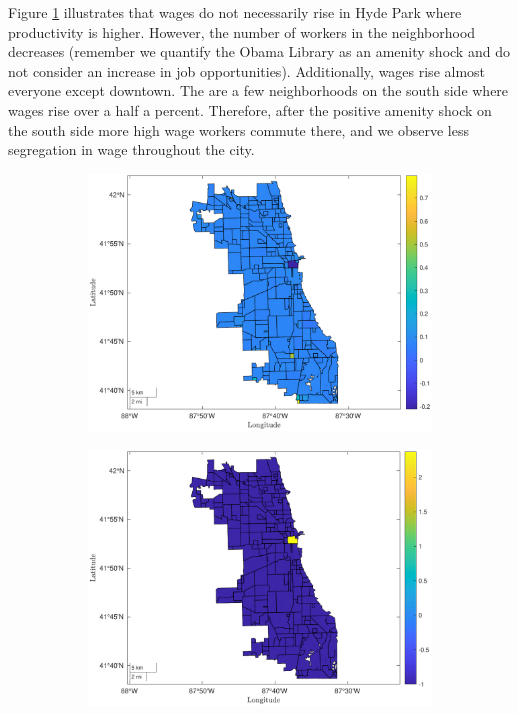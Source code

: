 \documentclass[12pt]{article}
\begin{document}
\clearpage
Figure \ref{fig:pop_wage_work} illustrates that wages do not necessarily rise in Hyde Park where productivity is higher. However, the number of workers in the neighborhood decreases (remember we quantify the Obama Library as an amenity shock and do not consider an increase in job opportunities). Additionally, wages rise almost everyone except downtown. The are a few neighborhoods on the south side where wages rise over a half a percent. Therefore, after the positive amenity shock on the south side more high wage workers commute there, and we observe less segregation in wage throughout the city. 
\begin{figure}[h!]
\centering
    \caption{Wages and Workers}
    \begin{subfigure}{0.75\textwidth}
         \centering
         \includegraphics[width=\textwidth]{Pset1/Figures/Single Agent/Counterfactual/Fix Population/wages.pdf}
    \end{subfigure}  
    \begin{subfigure}{0.75\textwidth}
         \centering
         \includegraphics[width=\linewidth]{Pset1/Figures/Single Agent/Counterfactual/Fix Population/workers.pdf}
    \end{subfigure}
    \label{fig:pop_wage_work}
\end{figure}
\end{document}
